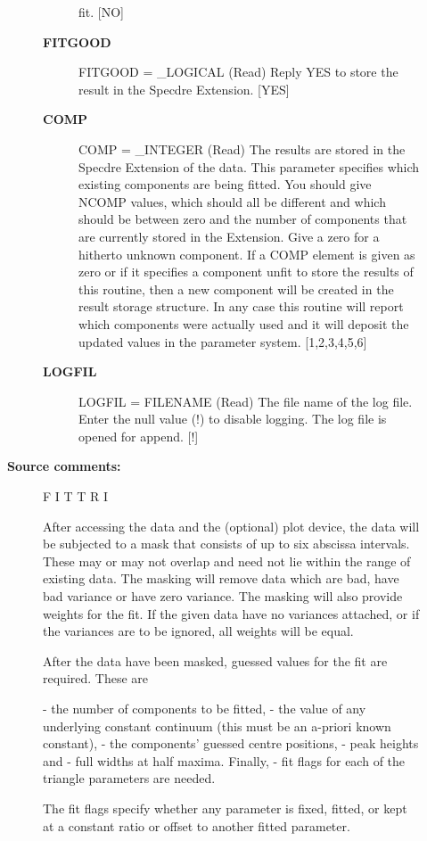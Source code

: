 \begin{description}
\begin{description}
\begin{description}
   fit. [NO]
\item [\textbf{FITGOOD}]
FITGOOD = \_LOGICAL (Read)
   Reply YES to store the result in the Specdre Extension. [YES]
\item [\textbf{COMP}]
COMP = \_INTEGER (Read)
   The results are stored in the Specdre Extension of the data.
   This parameter specifies which existing components are being
   fitted. You should give NCOMP values, which should all be
   different and which should be between zero and the number of
   components that are currently stored in the Extension. Give a
   zero for a hitherto unknown component. If a COMP element is
   given as zero or if it specifies a component unfit to store the
   results of this routine, then a new component will be created
   in the result storage structure. In any case this routine will
   report which components were actually used and it will deposit
   the updated values in the parameter system. [1,2,3,4,5,6]
\item [\textbf{LOGFIL}]
LOGFIL = FILENAME (Read)
   The file name of the log file. Enter the null value (!) to
   disable logging. The log file is opened for append. [!]

\end{description}

\item [\textbf{Source comments:}]
\begin{terminalv}
   F I T T R I

   After accessing the data and the (optional) plot device, the data
   will be subjected to a mask that consists of up to six abscissa
   intervals. These may or may not overlap and need not lie within
   the range of existing data. The masking will remove data which are
   bad, have bad variance or have zero variance. The masking will
   also provide weights for the fit. If the given data have no
   variances attached, or if the variances are to be ignored, all
   weights will be equal.

   After the data have been masked, guessed values for the fit are
   required. These are

   -  the number of components to be fitted,
   -  the value of any underlying constant continuum (this must be an
      a-priori known constant),
   -  the components' guessed centre positions,
   -  peak heights and
   -  full widths at half maxima. Finally,
   -  fit flags for each of the triangle parameters are needed.

   The fit flags specify whether any parameter is fixed, fitted, or
   kept at a constant ratio or offset to another fitted parameter.


\end{terminalv}
\end{description}
\end{description}

